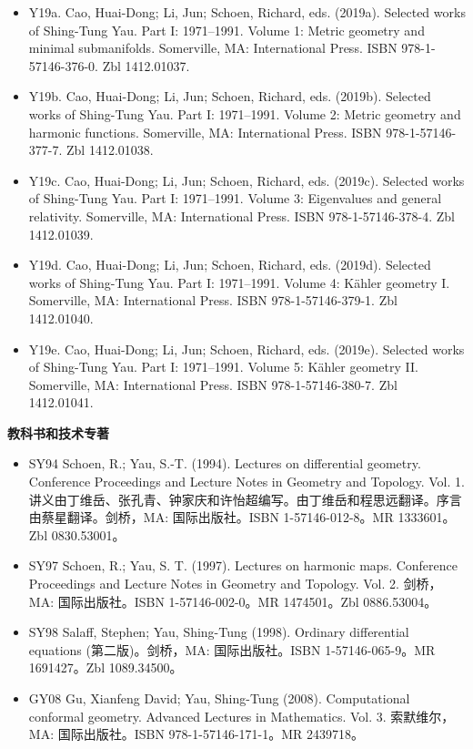 \begin{itemize}
\item Y19a. Cao, Huai-Dong; Li, Jun; Schoen, Richard, eds. (2019a). Selected works of Shing-Tung Yau. Part I: 1971–1991. Volume 1: Metric geometry and minimal submanifolds. Somerville, MA: International Press. ISBN 978-1-57146-376-0. Zbl 1412.01037.
\item Y19b. Cao, Huai-Dong; Li, Jun; Schoen, Richard, eds. (2019b). Selected works of Shing-Tung Yau. Part I: 1971–1991. Volume 2: Metric geometry and harmonic functions. Somerville, MA: International Press. ISBN 978-1-57146-377-7. Zbl 1412.01038.
\item Y19c. Cao, Huai-Dong; Li, Jun; Schoen, Richard, eds. (2019c). Selected works of Shing-Tung Yau. Part I: 1971–1991. Volume 3: Eigenvalues and general relativity. Somerville, MA: International Press. ISBN 978-1-57146-378-4. Zbl 1412.01039.
\item Y19d. Cao, Huai-Dong; Li, Jun; Schoen, Richard, eds. (2019d). Selected works of Shing-Tung Yau. Part I: 1971–1991. Volume 4: Kähler geometry I. Somerville, MA: International Press. ISBN 978-1-57146-379-1. Zbl 1412.01040.
\item Y19e. Cao, Huai-Dong; Li, Jun; Schoen, Richard, eds. (2019e). Selected works of Shing-Tung Yau. Part I: 1971–1991. Volume 5: Kähler geometry II. Somerville, MA: International Press. ISBN 978-1-57146-380-7. Zbl 1412.01041.
\end{itemize}
\textbf{教科书和技术专著}
\begin{itemize}
\item SY94 Schoen, R.; Yau, S.-T. (1994). Lectures on differential geometry. Conference Proceedings and Lecture Notes in Geometry and Topology. Vol. 1. 讲义由丁维岳、张孔青、钟家庆和许怡超编写。由丁维岳和程思远翻译。序言由蔡星翻译。剑桥，MA: 国际出版社。ISBN 1-57146-012-8。MR 1333601。Zbl 0830.53001。
\item SY97 Schoen, R.; Yau, S. T. (1997). Lectures on harmonic maps. Conference Proceedings and Lecture Notes in Geometry and Topology. Vol. 2. 剑桥，MA: 国际出版社。ISBN 1-57146-002-0。MR 1474501。Zbl 0886.53004。
\item SY98 Salaff, Stephen; Yau, Shing-Tung (1998). Ordinary differential equations (第二版)。剑桥，MA: 国际出版社。ISBN 1-57146-065-9。MR 1691427。Zbl 1089.34500。
\item GY08 Gu, Xianfeng David; Yau, Shing-Tung (2008). Computational conformal geometry. Advanced Lectures in Mathematics. Vol. 3. 索默维尔，MA: 国际出版社。ISBN 978-1-57146-171-1。MR 2439718。
\end{itemize}
